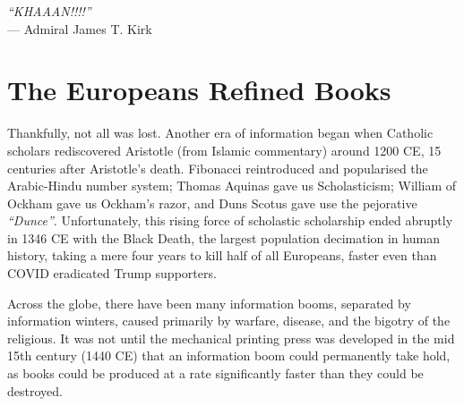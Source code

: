 \begin{center}
\textit{``KHAAAN!!!!''}\\ --- Admiral James T. Kirk
\end{center}

\section{The Europeans Refined Books}

Thankfully, not all was lost. Another era of information began when Catholic scholars rediscovered Aristotle (from Islamic commentary) around 1200 CE, 15 centuries after Aristotle's death. Fibonacci reintroduced and popularised the Arabic-Hindu number system; Thomas Aquinas gave us Scholasticism; William of Ockham gave us Ockham's razor, and Duns Scotus gave use the pejorative \textit{``Dunce''}. Unfortunately, this rising force of scholastic scholarship ended abruptly in 1346 CE with the Black Death, the largest population decimation in human history, taking a mere four years to kill half of all Europeans, faster even than COVID eradicated Trump supporters.

Across the globe, there have been many information booms, separated by information winters, caused primarily by warfare, disease, and the bigotry of the religious. It was not until the mechanical printing press was developed in the mid 15th century (1440 CE) that an information boom could permanently take hold, as books could be produced at a rate significantly faster than they could be destroyed.





